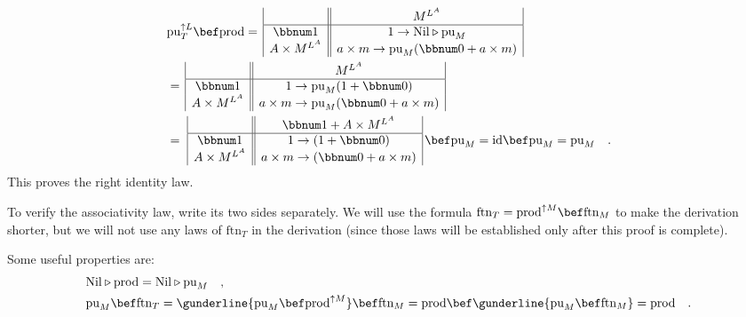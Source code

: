 \begin{align*}
 & \text{pu}_{T}^{\uparrow L}\bef\text{prod}=\,\begin{array}{|c||c|}
 & M^{L^{A}}\\
\hline \bbnum 1 & 1\rightarrow\text{Nil}\triangleright\text{pu}_{M}\\
A\times M^{L^{A}} & a\times m\rightarrow\text{pu}_{M}(\bbnum 0+a\times m)
\end{array}\\
 & =\,\begin{array}{|c||c|}
 & M^{L^{A}}\\
\hline \bbnum 1 & 1\rightarrow\text{pu}_{M}(1+\bbnum 0)\\
A\times M^{L^{A}} & a\times m\rightarrow\text{pu}_{M}(\bbnum 0+a\times m)
\end{array}\\
 & =\,\,\begin{array}{|c||c|}
 & \bbnum 1+A\times M^{L^{A}}\\
\hline \bbnum 1 & 1\rightarrow(1+\bbnum 0)\\
A\times M^{L^{A}} & a\times m\rightarrow(\bbnum 0+a\times m)
\end{array}\,\bef\text{pu}_{M}=\text{id}\bef\text{pu}_{M}=\text{pu}_{M}\quad.
\end{align*}
This proves the right identity law.

To verify the associativity law, write its two sides separately. We
will use the formula $\text{ftn}_{T}=\text{prod}^{\uparrow M}\bef\text{ftn}_{M}$
to make the derivation shorter, but we will not use any laws of $\text{ftn}_{T}$
in the derivation (since those laws will be established only after
this proof is complete).

Some useful properties are:
\begin{align*}
 & \text{Nil}\triangleright\text{prod}=\text{Nil}\triangleright\text{pu}_{M}\quad,\\
 & \text{pu}_{M}\bef\text{ftn}_{T}=\gunderline{\text{pu}_{M}\bef\text{prod}^{\uparrow M}}\bef\text{ftn}_{M}=\text{prod}\bef\gunderline{\text{pu}_{M}\bef\text{ftn}_{M}}=\text{prod}\quad.
\end{align*}

